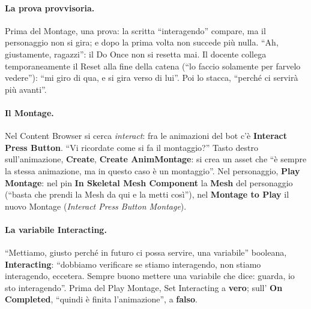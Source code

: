 \paragraph{La prova provvisoria.} Prima del Montage, una prova: la scritta ``interagendo''
compare, ma il personaggio non si gira; e dopo la prima volta non succede più nulla. ``Ah,
giustamente, ragazzi'': il Do Once non si resetta mai. Il docente collega temporaneamente
il Reset alla fine della catena (``lo faccio solamente per farvelo vedere''): ``mi giro di
qua, e si gira verso di lui''. Poi lo stacca, ``perché ci servirà più avanti''.

\paragraph{Il Montage.} Nel Content Browser si cerca \emph{interact}: fra le animazioni del
bot c'è \textbf{Interact Press Button}. ``Vi ricordate come si fa il montaggio?'' Tasto
destro sull'animazione, \textbf{Create}, \textbf{Create AnimMontage}: si crea un asset che
``è sempre la stessa animazione, ma in questo caso è un montaggio''. Nel personaggio,
\textbf{Play Montage}: nel pin \textbf{In Skeletal Mesh Component} la \textbf{Mesh} del
personaggio (``basta che prendi la Mesh da qui e la metti così''), nel \textbf{Montage to
Play} il nuovo Montage (\emph{Interact Press Button Montage}).

\paragraph{La variabile Interacting.} ``Mettiamo, giusto perché in futuro ci possa
servire, una variabile'' booleana, \textbf{Interacting}: ``dobbiamo verificare se stiamo
interagendo, non stiamo interagendo, eccetera. Sempre buono mettere una variabile che dice:
guarda, io sto interagendo''. Prima del Play Montage, Set Interacting a \textbf{vero}; sull'
\textbf{On Completed}, ``quindi è finita l'animazione'', a \textbf{falso}.

